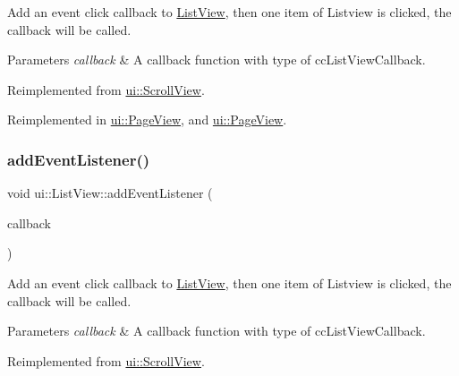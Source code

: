 Add an event click callback to \hyperlink{classui_1_1ListView}{List\+View}, then one item of Listview is clicked, the callback will be called. 
\begin{DoxyParams}{Parameters}
{\em callback} & A callback function with type of {\ttfamily cc\+List\+View\+Callback}. \\
\hline
\end{DoxyParams}


Reimplemented from \hyperlink{classui_1_1ScrollView_ad8aeb3841d9330558f538d4aad679073}{ui\+::\+Scroll\+View}.



Reimplemented in \hyperlink{classui_1_1PageView_a8887593dc71c203af06f8043082d2de4}{ui\+::\+Page\+View}, and \hyperlink{classui_1_1PageView_a8887593dc71c203af06f8043082d2de4}{ui\+::\+Page\+View}.

\mbox{\label{classui_1_1ListView_ac9579703c37e0c23eba035fe31e00ba5}} 
\subsubsection{\texorpdfstring{add\+Event\+Listener()}{addEventListener()}\hspace{0.1cm}{\footnotesize\ttfamily [2/2]}}
{\footnotesize\ttfamily void ui\+::\+List\+View\+::add\+Event\+Listener (\begin{DoxyParamCaption}\item[{const \hyperlink{classui_1_1ListView_ac67b2dd17d792bb61a9020b3935ffc79}{cc\+List\+View\+Callback} \&}]{callback }\end{DoxyParamCaption})\hspace{0.3cm}{\ttfamily [virtual]}}

Add an event click callback to \hyperlink{classui_1_1ListView}{List\+View}, then one item of Listview is clicked, the callback will be called. 
\begin{DoxyParams}{Parameters}
{\em callback} & A callback function with type of {\ttfamily cc\+List\+View\+Callback}. \\
\hline
\end{DoxyParams}


Reimplemented from \hyperlink{classui_1_1ScrollView_ad8aeb3841d9330558f538d4aad679073}{ui\+::\+Scroll\+View}.



